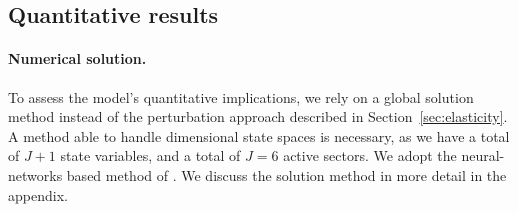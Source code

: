 \begin{table}[!t]    \captionsetup{font=normalsize,labelfont=bf,skip=2pt,labelsep=period}
	\caption{\textbf{Parameter values}}
	\caption*{\footnotesize{This table reports the parameter values used in calibrating the model.}}
    \vspace{2mm}
    \label{tab:calib}
    \centering
    \resizebox{.65\linewidth}{!}{}
\end{table}



\subsection{Quantitative results}

\paragraph{Numerical solution.} To assess the model's quantitative implications, we rely on a global solution method instead of the perturbation approach described in Section~\ref{sec:elasticity}.
A method able to handle dimensional state spaces is necessary, as we have a total of $J+1$ state variables, and a total of $J = 6$ active sectors.  
We adopt the neural-networks based method of \citet{duarte2024machine}. 
We discuss the solution method in more detail in the appendix. 

